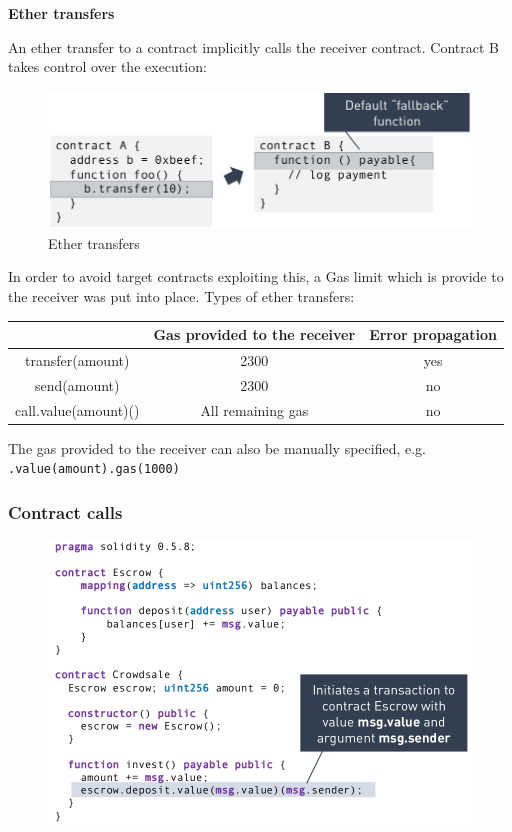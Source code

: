 \documentclass[11pt,oneside,a4paper]{article}
\begin{document}
\textbf{Ether transfers}

An ether transfer to a contract implicitly calls the receiver contract. Contract B takes control over the execution:

\vspace{-\topsep}
\begin{figure}[hb]
	\centering
	\includegraphics[width=0.5\linewidth]{figures/ether_transfer}
	\caption{Ether transfers}
	\label{fig:ethertransfer}
\end{figure}
\vspace{-\topsep}

In order to avoid target contracts exploiting this, a Gas limit which is provide to the receiver was put into place. Types of ether transfers:

\vspace{-\topsep}
\begin{center}
	\begin{tabular}{|c|c|c|}
		\hline 
		& Gas provided to the receiver & Error propagation \\
		\hline
		transfer(amount) & 2300 & yes \\ 
		\hline 
		send(amount) & 2300 & no \\ 
		\hline 
		call.value(amount)() & All remaining gas & no \\ 
		\hline 
	\end{tabular} 
\end{center}
\vspace{-\topsep}

The gas provided to the receiver can also be manually specified, e.g. \texttt{.value(amount).gas(1000)}

\newpage

\subsubsection{Contract calls}

\begin{figure}
	\centering
	\includegraphics[width=0.5\linewidth]{figures/contract_call_crowdsale}
	\label{fig:contractcallcrowdsale}
\end{figure}
\end{document}
